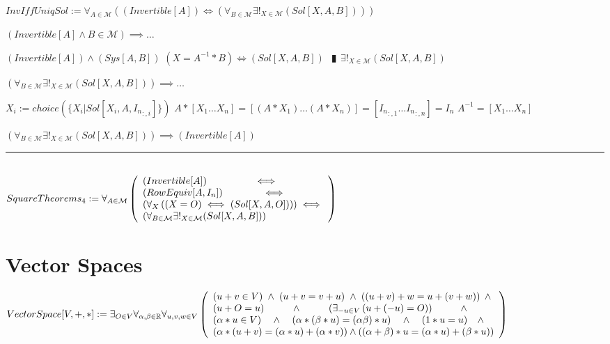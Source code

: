 \documentclass{book}
\newcommand{\abr}{:=}
\newcommand{\pipe}{$\phantom{(}\vrectangleblack\phantom{)}$}
\newcommand{\pr}[1]{\left(#1\right)}
\begin{document}
$InvIffUniqSol \abr \forall_{A \in \mathcal{M}}\pr{(Invertible[A]) \iff \pr{\forall_{B \in \mathcal{M}} \exists!_{X \in \mathcal{M}}(Sol[X, A, B])}}$
\begin{enumerate}
  \lit $(Invertible[A] \land B \in \mathcal{M}) \implies \ldots$
  \begin{enumerate}
    \lit $(Invertible[A]) \land (Sys[A, B])$
    \lit $(X = A^{-1} * B) \iff (Sol[X, A, B])$ \pipe $\exists!_{X \in \mathcal{M}}(Sol[X, A, B])$
  \end{enumerate}
  \lit $\pr{\forall_{B \in \mathcal{M}} \exists!_{X \in \mathcal{M}}(Sol[X, A, B])} \implies \ldots$
  \begin{enumerate}
    \lit $X_i \abr choice(\{X_i | Sol[X_i, A, {I_n}_{:, i}]\})$
    \lit $A * [X_1 \ldots X_n] = [(A * X_1) \ldots (A * X_n)] =  [{I_n}_{:, 1} \ldots {I_n}_{:, n}] = I_n$ \lit $A^{-1} = [X_1 \ldots X_n]$
  \end{enumerate}
  \lit $\pr{\forall_{B \in \mathcal{M}} \exists!_{X \in \mathcal{M}}(Sol[X, A, B])} \implies (Invertible[A])$
\end{enumerate} \vspace{.75mm} \hrule \vspace{.75mm} \ \\ 

$SquareTheorems_4 \abr \forall_{A \in \mathcal{M}}\left(\begin{array}{ll}
  (Invertible[A]) \hfill \iff \hfill \\
  (RowEquiv[A, I_n]) \hfill \iff \hfill \\
  \pr{\forall_{X}\pr{(X = O) \iff (Sol[X, A, O])}} \hfill \iff \hfill \\
  \pr{\forall_{B \in \mathcal{M}} \exists!_{X \in \mathcal{M}}(Sol[X, A, B])}
\end{array}\right)$ \\


\section{Vector Spaces}
$VectorSpace[V, +, *] \abr \exists_{O \in V} \forall_{\alpha ,\beta \in \mathbb{R}} \forall_{u, v, w \in V} \left(\begin{array}{ll}
  (u + v \in V) \hfill \land \hfill (u + v = v + u) \hfill \land \hfill \pr{(u + v) + w = u + (v + w)} \hfill \land \hfill \\
  (u + O = u) \hfill \land \hfill \pr{\exists_{-u \in V}\pr{u + (-u) = O}} \hfill \land \hfill \\
  (\alpha * u \in V) \hfill \land \hfill \pr{\alpha * (\beta * u) = (\alpha \beta) * u} \hfill \land \hfill (1 * u = u) \hfill \land \hfill \\
  \pr{\alpha * (u + v) = (\alpha * u) + (\alpha * v)}  \hfill \land \hfill \pr{(\alpha + \beta) * u = (\alpha * u) + (\beta * u)} \\
\end{array}\right)$
\end{document}
